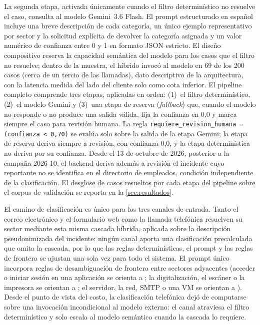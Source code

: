 La segunda etapa, activada únicamente cuando el filtro determinístico no resuelve el caso, consulta al modelo Gemini~3.6 Flash. El prompt estructurado en español incluye una breve descripción de cada categoría, un único ejemplo representativo por sector y la solicitud explícita de devolver la categoría asignada y un valor numérico de confianza entre 0 y 1 en formato JSON estricto. El diseño compositivo reserva la capacidad semántica del modelo para los casos que el filtro no resuelve; dentro de la muestra, el híbrido invocó al modelo en 69 de los 200 casos (cerca de un tercio de las llamadas), dato descriptivo de la arquitectura, con la latencia medida del lado del cliente solo como cota inferior. El pipeline completo comprende tres etapas, aplicadas en orden: (1)~el filtro determinístico, (2)~el modelo Gemini y (3)~una etapa de reserva (\emph{fallback}) que, cuando el modelo no responde o no produce una salida válida, fija la confianza en 0,0 y marca siempre el caso para revisión humana. La regla \texttt{requiere\_revision\_humana = (confianza < 0{,}70)} se evalúa solo sobre la salida de la etapa Gemini; la etapa de reserva deriva siempre a revisión, con confianza 0,0, y la etapa determinística no deriva por su confianza. Desde el 13 de octubre de 2026, posterior a la campaña 2026-10, el backend deriva además a revisión el incidente cuyo reportante no se identifica en el directorio de empleados, condición independiente de la clasificación. El desglose de casos resueltos por cada etapa del pipeline sobre el corpus de validación se reporta en la \autoref{sec:resultados}.

El camino de clasificación es único para los tres canales de entrada. Tanto el correo electrónico y el formulario web como la llamada telefónica resuelven su sector mediante esta misma cascada híbrida, aplicada sobre la descripción pseudonimizada del incidente: ningún canal aporta una clasificación precalculada que omita la cascada, por lo que las reglas determinísticas, el prompt y las reglas de frontera se ajustan una sola vez para todo el sistema. El prompt único incorpora reglas de desambiguación de frontera entre sectores adyacentes (acceder o iniciar sesión en una aplicación se orienta a ; la digitalización, el escáner o la impresora se orientan a ; el servidor, la red, SMTP o una VM se orientan a ). Desde el punto de vista del costo, la clasificación telefónica dejó de computarse sobre una invocación incondicional al modelo externo: el canal atraviesa el filtro determinístico y solo escala al modelo semántico cuando la cascada lo requiere.

